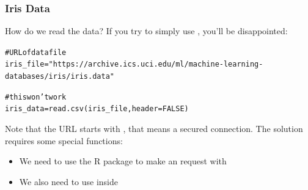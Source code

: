 \documentclass{beamer}\usepackage[]{graphicx}\usepackage[]{color}
\makeatletter
\newcommand{\hlnum}[1]{\textcolor[rgb]{0.063,0.58,0.627}{#1}}%
\newcommand{\hlstr}[1]{\textcolor[rgb]{0.063,0.58,0.627}{#1}}%
\newcommand{\hlcom}[1]{\textcolor[rgb]{0.588,0.588,0.588}{#1}}%
\newcommand{\hlstd}[1]{\textcolor[rgb]{0.196,0.196,0.196}{#1}}%
\newcommand{\hlkwb}[1]{\textcolor[rgb]{0.627,0,0.314}{#1}}%
\newcommand{\hlkwc}[1]{\textcolor[rgb]{0,0.631,0.314}{#1}}%
\newcommand{\hlkwd}[1]{\textcolor[rgb]{0.78,0.227,0.412}{#1}}%
\newenvironment{kframe}{%
 \def\at@end@of@kframe{}%
 \ifinner\ifhmode%
  \def\at@end@of@kframe{\end{minipage}}%
  \begin{minipage}{\columnwidth}%
 \fi\fi%
 \def\FrameCommand##1{\hskip\@totalleftmargin \hskip-\fboxsep
 \colorbox{shadecolor}{##1}\hskip-\fboxsep
     \hskip-\linewidth \hskip-\@totalleftmargin \hskip\columnwidth}%
 \MakeFramed {\advance\hsize-\width
   \@totalleftmargin\z@ \linewidth\hsize
   \@setminipage}}%
 {\par\unskip\endMakeFramed%
 \at@end@of@kframe}
\newenvironment{knitrout}{}{} %
\makeatother
\begin{document}
\begin{frame}[fragile]
\frametitle{Iris Data}

\begin{block}{How do we read the data?}
If you try to simply use , you'll be disappointed:
\begin{knitrout}\tiny
{}\color{fgcolor}\begin{kframe}
\begin{alltt}
\hlcom{# URL of data file}
\hlstd{iris_file} \hlkwb{=} \hlstr{"https://archive.ics.uci.edu/ml/machine-learning-databases/iris/iris.data"}

\hlcom{# this won't work}
\hlstd{iris_data} \hlkwb{=} \hlkwd{read.csv}\hlstd{(iris_file,} \hlkwc{header} \hlstd{=} \hlnum{FALSE}\hlstd{)}
\end{alltt}
\end{kframe}
\end{knitrout}
\end{block}

Note that the URL starts with , that means a secured connection. The solution requires some special functions:
\begin{itemize}
 \item We need to use the R package  to make an  request with 
 \item We also need to use  inside 
\end{itemize}

\end{frame}

\end{document}

